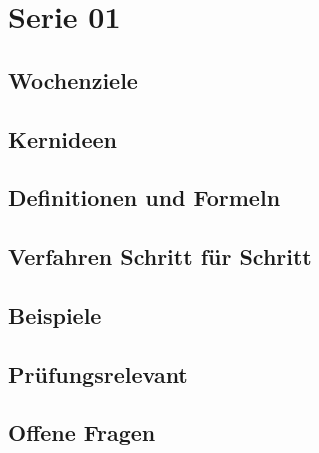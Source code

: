 \chapter{Serie 01}
\label{kap:serie01}

\section*{Wochenziele}
\begin{wochenziele}
\end{wochenziele}

\section{Kernideen}

\section{Definitionen und Formeln}

\section{Verfahren Schritt für Schritt}

\section{Beispiele}

\section{Prüfungsrelevant}

\section{Offene Fragen}
